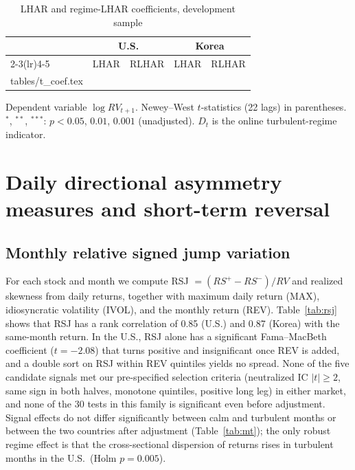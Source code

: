 \documentclass[11pt]{article}
\makeatletter
\newcommand\inputtable[1]{\@@input #1 }
\makeatother
\begin{document}
\begin{table}[!htbp]
\centering
\begin{threeparttable}
\caption{LHAR and regime-LHAR coefficients, development sample}\label{tab:coef}
\scriptsize
\begin{tabular}{lcccc}
\toprule
 & \multicolumn{2}{c}{U.S.} & \multicolumn{2}{c}{Korea} \\
\cmidrule(lr){2-3}\cmidrule(lr){4-5}
 & LHAR & RLHAR & LHAR & RLHAR \\
\midrule
\inputtable{tables/t_coef.tex}
\bottomrule
\end{tabular}
\begin{tablenotes}\footnotesize
\item Dependent variable $\log RV_{t+1}$. Newey--West $t$-statistics (22 lags) in parentheses. $^{*}$, $^{**}$, $^{***}$: $p<0.05$, $0.01$, $0.001$ (unadjusted). $D_t$ is the online turbulent-regime indicator.
\end{tablenotes}
\end{threeparttable}
\end{table}

\section{Daily directional asymmetry measures and short-term reversal}\label{sec:skew}

\subsection{Monthly relative signed jump variation}

For each stock and month we compute RSJ $=(RS^{+}-RS^{-})/RV$ and realized skewness from daily returns, together with maximum daily return (MAX), idiosyncratic volatility (IVOL), and the monthly return (REV). Table~\ref{tab:rsj} shows that RSJ has a rank correlation of 0.85 (U.S.) and 0.87 (Korea) with the same-month return. In the U.S., RSJ alone has a significant Fama--MacBeth coefficient ($t=-2.08$) that turns positive and insignificant once REV is added, and a double sort on RSJ within REV quintiles yields no spread. None of the five candidate signals met our pre-specified selection criteria (neutralized IC $|t|\ge2$, same sign in both halves, monotone quintiles, positive long leg) in either market, and none of the 30 tests in this family is significant even before adjustment. Signal effects do not differ significantly between calm and turbulent months or between the two countries after adjustment (Table~\ref{tab:mt}); the only robust regime effect is that the cross-sectional dispersion of returns rises in turbulent months in the U.S.\ (Holm $p=0.005$).
\end{document}
